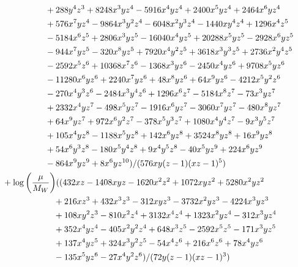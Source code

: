 \documentclass[letter,11pt,DIV=12,abstract=true,numbers=noenddot,titlepage=false,twocolumn=false,draft=false]{scrartcl}
\begin{document}
\begin{equation}
\begin{split}
      & \qquad \qquad \qquad + 288 y^4 z^3 + 8248 x^3 y z^4 - 5916 x^4 y z^4 + 2400 x^5 y z^4 + 2464 x^6 y z^4\\
      & \qquad \qquad \qquad + 576 x^7 y z^4 - 9864 x^3 y^2 z^4 - 6048 x^2 y^3 z^4 - 1440 x y^4 z^4 + 1296 x^4 z^5\\
      & \qquad \qquad \qquad - 5184 x^6 z^5 + 2806 x^3 y z^5 - 16040 x^4 y z^5 + 20288 x^5 y z^5 - 2928 x^6 y z^5\\
      & \qquad \qquad \qquad - 944 x^7 y z^5 - 320 x^8 y z^5 + 7920 x^4 y^2 z^5 + 3618 x^3 y^3 z^5 + 2736 x^2 y^4 z^5\\
      & \qquad \qquad \qquad - 2592 x^5 z^6 + 10368 x^7 z^6 - 1368 x^3 y z^6 - 2450 x^4 y z^6 + 9708 x^5 y z^6\\
      & \qquad \qquad \qquad - 11280 x^6 y z^6 + 2240 x^7 y z^6 + 48 x^8 y z^6 + 64 x^9 y z^6 - 4212 x^5 y^2 z^6\\
      & \qquad \qquad \qquad - 270 x^4 y^3 z^6 - 2484 x^3 y^4 z^6 + 1296 x^6 z^7 - 5184 x^8 z^7 - 73 x^3 y z^7\\
      & \qquad \qquad \qquad + 2332 x^4 y z^7 - 498 x^5 y z^7 - 1916 x^6 y z^7 - 3060 x^7 y z^7 - 480 x^8 y z^7\\
      & \qquad \qquad \qquad + 64 x^9 y z^7 + 972 x^6 y^2 z^7 - 378 x^5 y^3 z^7 + 1080 x^4 y^4 z^7 - 9 x^3 y^5 z^7\\
      & \qquad \qquad \qquad + 105 x^4 y z^8 - 1188 x^5 y z^8 + 142 x^6 y z^8 + 3524 x^8 y z^8 + 16 x^9 y z^8\\
      & \qquad \qquad \qquad + 54 x^6 y^3 z^8 - 180 x^5 y^4 z^8 + 9 x^4 y^5 z^8 - 40 x^5 y z^9 + 224 x^6 y z^9\\
      & \qquad \qquad \qquad - 864 x^9 y z^9 + 8 x^6 y z^{10})/(576 x y (z-1) (x z-1)^5)\\
& \quad + \log\bigg(\frac{\mu}{M_W}\bigg) ((432 x z - 1408 x y z - 1620 x^2 z^2 + 1072 x y z^2 + 5280 x^2 y z^2\\
      & \qquad \qquad \qquad \quad + 216 x z^3 + 432 x^3 z^3 - 312 x y z^3 - 3732 x^2 y z^3 - 4224 x^3 y z^3\\
      & \qquad \qquad \qquad \quad + 108 x y^2 z^3 - 810 x^2 z^4 + 3132 x^4 z^4 + 1323 x^2 y z^4 - 312 x^3 y z^4\\
      & \qquad \qquad \qquad \quad + 352 x^4 y z^4 - 405 x^2 y^2 z^4 + 648 x^3 z^5 - 2592 x^5 z^5 - 171 x^3 y z^5\\
      & \qquad \qquad \qquad \quad + 137 x^4 y z^5 + 324 x^3 y^2 z^5 - 54 x^4 z^6 + 216 x^6 z^6 + 78 x^4 y z^6\\
      & \qquad \qquad \qquad \quad - 135 x^5 y z^6 - 27 x^4 y^2 z^6)/(72 y (z-1) (x z-1)^3)\\
\notag
\end{split}
\end{equation}
\end{document}
